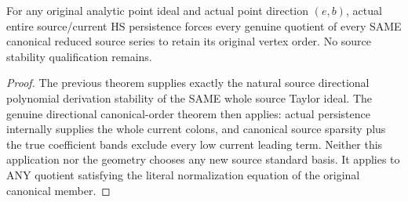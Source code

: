 \begin{theorem}
\label{hir:actual-original-arbitrary-point-persistent-canonical-orders}
\leanok
For any original analytic point ideal and actual point direction $(e,b)$,
actual entire source/current HS persistence forces every genuine quotient
of every SAME canonical reduced source series to retain its original vertex
order. No source stability qualification remains.
\end{theorem}
\begin{proof}
The previous theorem supplies exactly the natural source directional
polynomial derivation stability of the SAME whole source Taylor ideal.
The genuine directional canonical-order theorem then applies: actual
persistence internally supplies the whole current colons, and canonical
source sparsity plus the true coefficient bands exclude every low current
leading term. Neither this application nor the geometry chooses any new
source standard basis. It applies to ANY quotient satisfying the literal
normalization equation of the original canonical member.
\end{proof}

